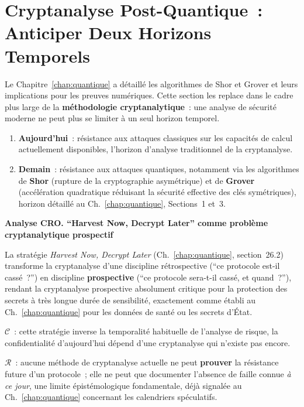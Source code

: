 \section{Cryptanalyse Post-Quantique~: Anticiper Deux Horizons Temporels}
\label{sec:cryptanalyse-pq}

Le Chapitre~\ref{chap:quantique} a détaillé les algorithmes de Shor
et Grover et leurs implications pour les preuves numériques. Cette
section les replace dans le cadre plus large de la
\textbf{méthodologie cryptanalytique}~: une analyse de sécurité
moderne ne peut plus se limiter à un seul horizon temporel.

\begin{enumerate}
    \item \textbf{Aujourd'hui}~: résistance aux attaques classiques
          sur les capacités de calcul actuellement disponibles, l'horizon d'analyse traditionnel de la cryptanalyse.
    \item \textbf{Demain}~: résistance aux attaques quantiques,
          notamment via les algorithmes de \textbf{Shor} (rupture
          de la cryptographie asymétrique) et de \textbf{Grover}
          (accélération quadratique réduisant la sécurité effective
          des clés symétriques), horizon détaillé au
          Ch.~\ref{chap:quantique}, Sections~1 et~3.
\end{enumerate}

\begin{boxCRO}
\textbf{Analyse CRO. ``Harvest Now, Decrypt Later'' comme
problème cryptanalytique prospectif}

La stratégie \textit{Harvest Now, Decrypt Later}
(Ch.~\ref{chap:quantique}, section~26.2) transforme la cryptanalyse
d'une discipline rétrospective (``ce protocole est-il cassé~?'')
en discipline \textbf{prospective} (``ce protocole sera-t-il
cassé, et quand~?''), rendant la cryptanalyse prospective
absolument critique pour la protection des secrets à très longue
durée de sensibilité, exactement comme établi au
Ch.~\ref{chap:quantique} pour les données de santé ou les
secrets d'État.

$\mathcal{C}$~: cette stratégie inverse la temporalité habituelle
de l'analyse de risque, la confidentialité d'aujourd'hui dépend
d'une cryptanalyse qui n'existe pas encore.

$\mathcal{R}$~: aucune méthode de cryptanalyse actuelle ne peut
\textbf{prouver} la résistance future d'un protocole~; elle ne peut
que documenter l'absence de faille connue \emph{à ce jour}, une
limite épistémologique fondamentale, déjà signalée au
Ch.~\ref{chap:quantique} concernant les calendriers spéculatifs.

\end{boxCRO}

